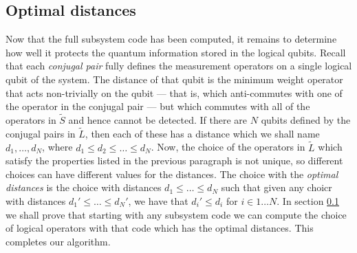 \documentclass[twocolumn,showpacs,preprintnumbers,amsmath,amssymb,nofootinbib,pra,floatfix]{revtex4}
\newcommand{\set}{\tilde}
\begin{document}
\subsection{Optimal distances}

\label{optimal-distances}

Now that the full subsystem code has been computed, it remains to determine how well it protects the quantum information stored in the logical qubits.  Recall that each \emph{conjugal pair} fully defines the measurement operators on a single logical qubit of the system.  The distance of that qubit is the minimum weight operator that acts non-trivially on the qubit --- that is, which anti-commutes with one of the operator in the conjugal pair --- but which commutes with all of the operators in $\set S$ and hence cannot be detected.  If there are $N$ qubits defined by the conjugal pairs in $\set L$, then each of these has a distance which we shall name $d_1,\dots,d_N$, where $d_1\le d_2 \le \dots \le d_N$.  Now, the choice of the operators in $\set L$ which satisfy the properties listed in the previous paragraph is not unique, so different choices can have different values for the distances.  The choice with the \emph{optimal distances} is the choice with distances $d_1\le \dots \le d_N$ such that given any choicr with distances $d_1'\le \dots \le d_N'$, we have that $d_i' \le d_i$ for $i\in 1\dots N$.  In section \ref{optimal-distances} we shall prove that starting with any subsystem code we can compute the choice of logical operators with that code which has the optimal distances.  This completes our algorithm.
\end{document}
